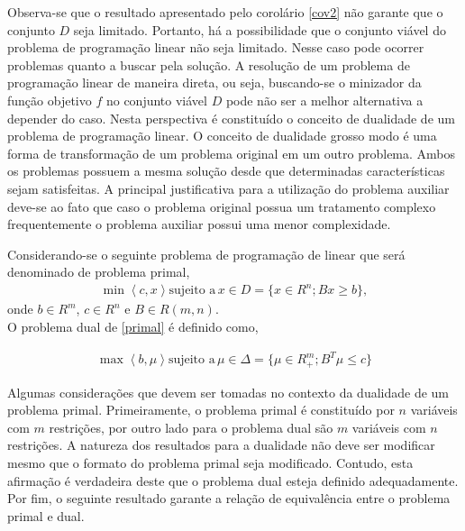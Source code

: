 Observa-se que o resultado apresentado pelo corol\'ario \autoref{cov2} n\~ao garante que o conjunto $D$ seja limitado. 
Portanto, h\'a a possibilidade que o conjunto vi\'avel do problema de programa\c c\~ao linear n\~ao seja limitado. Nesse
caso  pode ocorrer problemas quanto a buscar pela solu\c c\~ao. A resolu\c c\~ao de um problema de programa\c c\~ao linear
de maneira direta, ou seja, buscando-se o minizador da fun\c c\~ao objetivo $f$ no conjunto vi\'avel $D$ pode n\~ao ser 
a melhor alternativa a depender do caso.
Nesta perspectiva  \'e constitu\'ido o conceito de dualidade de um problema de programa\c c\~ao linear.
O conceito de dualidade  grosso modo \'e uma forma de transforma\c c\~ao de um problema original em um outro problema.
Ambos os problemas possuem a mesma solu\c c\~ao desde que determinadas caracter\'isticas sejam satisfeitas. A principal
justificativa para a utiliza\c c\~ao do problema auxiliar deve-se ao fato que caso o problema original possua um tratamento complexo
frequentemente o problema auxiliar possui uma menor complexidade. 
	\begin{defin}%
		Considerando-se o seguinte problema de programa\c c\~ao de linear que ser\'a denominado de problema primal,
				\begin{align}
					\label {primal}
					\min \left < c,x \right >  \mbox{sujeito a} \hspace{2pt} x \in D = \{ x \in R^n;Bx \geq b \},
				\end{align}
				onde $b \in R^m$, $c \in R^n$ e $B \in R(m,n)$.\\
				O problema dual de \ref{primal} \'e definido como,
			\begin{center}
				\begin{align}
					\label {dual}
					\max \left<b,\mu \right> \mbox{sujeito a} \hspace{2pt} \mu \in \Delta = \{ \mu \in R_{+}^{m}; B^T\mu \leq c\}
				\end{align}
			\end{center}
  	\end{defin}
Algumas considera\c c\~oes que devem ser tomadas no contexto da dualidade de um problema primal. Primeiramente, o
problema primal \'e constitu\'ido por $n$ vari\'aveis com $m$ restri\c c\~oes, por outro lado para o problema dual
s\~ao $m$ vari\'aveis com  $n$ restri\c c\~oes. A natureza dos resultados para a dualidade n\~ao deve ser modificar 
mesmo que o formato do problema primal seja 
modificado. Contudo, esta afirma\c c\~ao  \'e verdadeira deste que o problema dual esteja definido 
adequadamente. Por fim, o seguinte resultado garante a rela\c c\~ao de equival\^encia entre o problema primal e dual.

